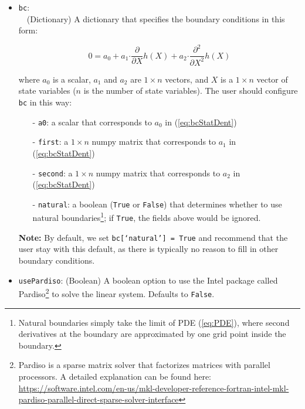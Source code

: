\documentclass[12pt]{article}
\begin{document}
\begin{itemize}
\begin{itemize}
    \end{itemize}
\item \texttt{bc}: \\~\ (Dictionary) A dictionary that specifies the boundary conditions in this form:

\begin{equation}
\label{eq:bcStatDent}
0 = a_0  + a_1 \boldsymbol{\cdot} \frac{\partial}{\partial{X}} h(X) + a_2 \boldsymbol{\cdot} \frac{\partial ^2}{\partial X^2} h(X)
\end{equation}

where $a_0$ is a scalar,  $a_1$ and $a_2$ are $1 \times n$ vectors, and $X$ is a $1 \times n$ vector of state variables  ($n$ is the number of state variables). The user should configure \texttt{bc} in this way:

\begin{itemize}
\item[-] \texttt{a0}: a scalar that corresponds to $a_0$ in (\ref{eq:bcStatDent})
\item[-] \texttt{first}: a $1 \times n$ numpy matrix that corresponds to $a_1$ in (\ref{eq:bcStatDent})
\item[-] \texttt{second}: a $1 \times n$ numpy matrix that corresponds to $a_2$ in (\ref{eq:bcStatDent})
\item[-] \texttt{natural}: a boolean (\texttt{True} or \texttt{False}) that determines whether to use natural boundaries\footnote{Natural boundaries simply take the limit of PDE (\ref{eq:PDE}), where second derivatives at the boundary are approximated by one grid point inside the boundary.}; if \texttt{True}, the fields above would be ignored.
\end{itemize}

\textbf{Note:} By default, we set \texttt{bc[`natural'] = True} and recommend that the user stay with this default, as there is typically no reason to fill in other boundary conditions.

\item \texttt{usePardiso}: (Boolean) A boolean option to use the Intel package called
Pardiso\footnote{Pardiso is a sparse matrix solver that factorizes matrices with parallel processors. A detailed explanation can be found here: \href{https://software.intel.com/en-us/mkl-developer-reference-fortran-intel-mkl-pardiso-parallel-direct-sparse-solver-interface}{https://software.intel.com/en-us/mkl-developer-reference-fortran-intel-mkl-pardiso-parallel-direct-sparse-solver-interface}} to solve the linear system. Defaults to \texttt{False}.


\end{itemize}
\end{document}
